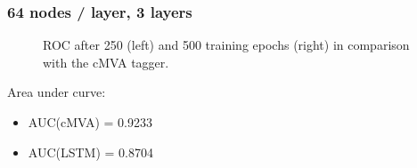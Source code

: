 \documentclass{beamer}
\begin{document}
\begin{frame}
  \frametitle{64 nodes / layer, 3 layers}

  \begin{figure}[htb]
    \centering

    \caption{ROC after 250 (left) and 500 training epochs (right) in comparison with the cMVA tagger.}
  \end{figure}

  Area under curve:
  \begin{itemize}
  \item AUC(cMVA) = 0.9233
  \item AUC(LSTM) = 0.8704
  \end{itemize}
  
\end{frame}
\end{document}
